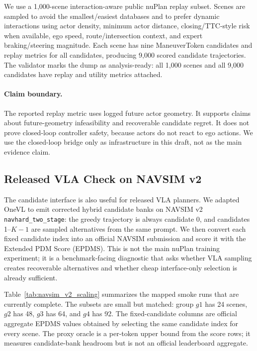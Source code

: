 \documentclass{article}
\begin{document}
We use a 1,000-scene interaction-aware public nuPlan replay subset. Scenes are sampled to
avoid the smallest/easiest databases and to prefer dynamic interactions using actor
density, minimum actor distance, closing/TTC-style risk when available, ego speed,
route/intersection context, and expert braking/steering magnitude. Each scene has nine
ManeuverToken candidates and replay metrics for all candidates, producing 9,000 scored
candidate trajectories. The validator marks the dump as analysis-ready: all 1,000 scenes
and all 9,000 candidates have replay and utility metrics attached.

\paragraph{Claim boundary.}
The reported replay metric uses logged future actor geometry. It supports claims about
future-geometry infeasibility and recoverable candidate regret. It does not prove closed-loop
controller safety, because actors do not react to ego actions. We use the closed-loop
bridge only as infrastructure in this draft, not as the main evidence claim.

\subsection{Released VLA Check on NAVSIM v2}
\label{sec:exp:navsim_v2}

The candidate interface is also useful for released VLA planners. We adapted OneVL to
emit corrected hybrid candidate banks on NAVSIM v2 \texttt{navhard\_two\_stage}: the
greedy trajectory is always candidate 0, and candidates 1--$K-1$ are sampled alternatives
from the same prompt. We then convert each fixed candidate index into an official NAVSIM
submission and score it with the Extended PDM Score (EPDMS). This is not the main nuPlan
training experiment; it is a benchmark-facing diagnostic that asks whether VLA sampling
creates recoverable alternatives and whether cheap interface-only selection is already
sufficient.

Table~\ref{tab:navsim_v2_scaling} summarizes the mapped smoke runs that are currently
complete. The subsets are small but matched: group \(g1\) has 24 scenes, \(g2\) has 48,
\(g3\) has 64, and \(g4\) has 92. The fixed-candidate columns are official aggregate
EPDMS values obtained by selecting the same candidate index for every scene. The proxy
oracle is a per-token upper bound from the score rows; it measures candidate-bank
headroom but is not an official leaderboard aggregate.
\end{document}
